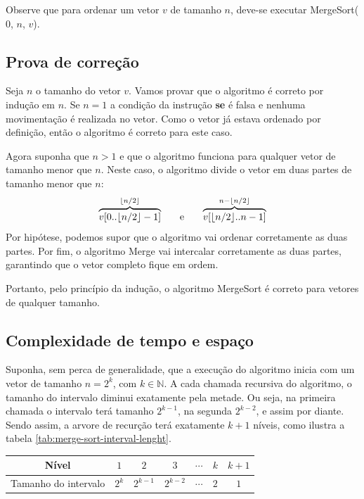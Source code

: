 Observe que para ordenar um vetor $v$ de tamanho $n$, deve-se executar MergeSort($0$, $n$, $v$).

\subsection{Prova de correção}
Seja $n$ o tamanho do vetor $v$. Vamos provar que o algoritmo é correto por indução em $n$. Se $n = 1$ a condição da instrução \textbf{se} é falsa e nenhuma movimentação é realizada no vetor. Como o vetor já estava ordenado por definição, então o algoritmo é correto para este caso.

Agora suponha que $n > 1$ e que o algoritmo funciona para qualquer vetor de tamanho menor que $n$. Neste caso, o algoritmo divide o vetor em duas partes de tamanho menor que $n$:
\[
  \overbrace{v[0..\lfloor n/2\rfloor-1]}^{\lfloor n/2\rfloor} \hspace{0.5cm}\text{ e }\hspace{0.5cm} \overbrace{v[\lfloor n/2\rfloor..n-1]}^{n - \lfloor n/2\rfloor}
\]
Por hipótese, podemos supor que o algoritmo vai ordenar corretamente as duas partes. Por fim, o algoritmo Merge vai intercalar corretamente as duas partes, garantindo que o vetor completo fique em ordem.

Portanto, pelo princípio da indução, o algoritmo MergeSort é correto para vetores de qualquer tamanho.

\subsection{Complexidade de tempo e espaço}
Suponha, sem perca de generalidade, que a execução do algoritmo inicia com um vetor de tamanho $n = 2^k$, com $k \in \mathbb{N}$. A cada chamada recursiva do algoritmo, o tamanho do intervalo diminui exatamente pela metade. Ou seja, na primeira chamada o intervalo terá tamanho $2^{k-1}$, na segunda $2^{k-2}$, e assim por diante. Sendo assim, a arvore de recurção terá exatamente $k+1$ níveis, como ilustra a tabela \ref{tab:merge-sort-interval-lenght}.

\begin{table}[!h]
    \centering
    \begin{tabular}{c|c|c|c|c|c|c}
        Nível & $1$ & $2$ & $3$ & $\cdots$ & $k$ & $k+1$ \\
        \hline
        Tamanho do intervalo & $2^k$ & $2^{k-1}$ & $2^{k-2}$ & $\cdots$ & $2$ & $1$ \\
    \end{tabular}
\end{table}

